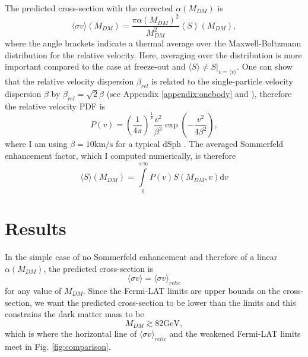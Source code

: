The predicted cross-section with the corrected \(\alpha (M_{DM} )\) is
\begin{equation}\label{eq:sigma_enhanced}
	\langle \sigma v \rangle (M_{DM} )= \frac{\pi \alpha (M_{DM} )^2}{M_{DM} ^2} \left \langle S \right \rangle(M_{DM} ),
\end{equation}
where the angle brackets indicate a thermal average over the Maxwell-Boltzmann distribution for the relative velocity. Here, averaging over the distribution is more important compared to the case at freeze-out and \(\langle S \rangle \neq S|_{v= \langle v \rangle }\). One can show that the relative velocity dispersion \(\beta_{rel} \) is related to the single-particle velocity dispersion \(\beta \) by \(\beta _{rel} = \sqrt{2} \beta \) (see Appendix \ref{appendix:onebody} and \cite{Ferrer_2013}), therefore the relative velocity PDF is
\begin{equation}
	P(v ) = \left( \frac{1}{4\pi } \right)^\frac{1}{2} \frac{v ^2}{\beta ^3} \exp \left( -\frac{v ^2}{4 \beta ^2} \right),
\end{equation}
where I am using \(\beta = 10 \mathrm{km / s} \) for a typical dSph \cite{Walker_2013, Arkani_2009}.
The averaged Sommerfeld enhancement factor, which I computed numerically, is therefore
\begin{equation}
	\langle S \rangle (M_{DM} ) = \int\limits_0^{+ \infty } P(v ) S(M_{DM}, v ) \mathrm{d} v
\end{equation}


\section{Results}\label{sec:results}
In the simple case of no Sommerfeld enhancement and therefore of a linear \(\alpha (M_{DM} )\), the predicted cross-section is
\begin{equation}
	\langle \sigma v \rangle = \langle \sigma v \rangle _{relic}
\end{equation}
for any value of \(M_{DM} \). Since the Fermi-LAT limits are upper bounds on the cross-section, we want the predicted cross-section to be lower than the limits and this constrains the dark matter mass to be
\begin{equation}\label{eq:result_simple}
	M_{DM} \gtrsim 82 \mathrm{GeV}, 
\end{equation}
which is where the horizontal line of \(\langle \sigma v \rangle _{relic} \) and the weakened Fermi-LAT limits meet in Fig. \ref{fig:comparison}.

